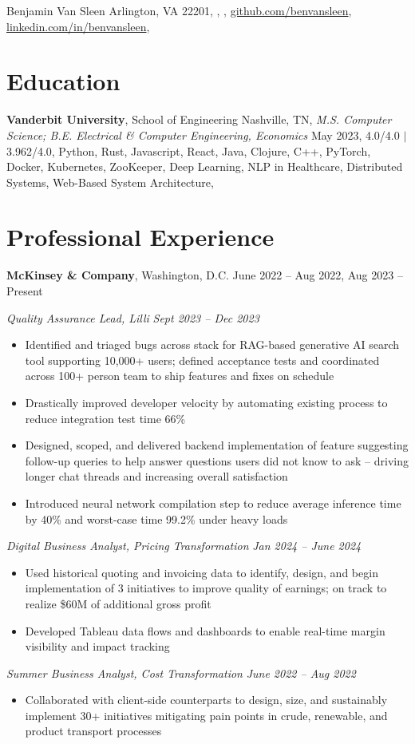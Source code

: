 \documentclass[10.5pt]{article}
\newcommand{\postlinebreakspacing} {
  \vspace{0.4ex}
}
\newcommand{\roleheader}[3]{
  \postlinebreakspacing
  \textbf{#1}, #2 \hfill #3
}
\newcommand{\role}[4]{
  \roleheader{#1}{#2}{#3}

  #4
}
\newcommand{\subrole}[5]{
  \vspace{0.1ex}
  \textit{#1, #2} \hfill \textit{#3 -- #4}

  \begin{itemize}
    #5
  \end{itemize}
}
\begin{document}

\resumeheader
{Benjamin Van Sleen}
{
	{Arlington, VA 22201},
	\PHONE,
	\href{mailto:\EMAIL}{\EMAIL},
	\href{https://github.com/benvansleen}{github.com/benvansleen},
	\href{https://linkedin.com/in/benvansleen}{linkedin.com/in/benvansleen},
}

\section*{Education}
\postlinebreakspacing
\lines
{
	{\textbf{Vanderbit University}, School of Engineering \hfill Nashville, TN},
	\hspace*{1em}\textit{M.S. Computer Science; B.E. Electrical \& Computer Engineering, Economics} \hfill May 2023,
	 {4.0/4.0} $\mid$  {3.962/4.0},
	 {Python, Rust, Javascript, React, Java, Clojure, C++, PyTorch, Docker, Kubernetes, ZooKeeper},
	 {Deep Learning, NLP in Healthcare, Distributed Systems, Web-Based System Architecture},
}


\section*{Professional Experience}
\role
{McKinsey \& Company}
{Washington, D.C.}
{June 2022 -- Aug 2022, Aug 2023 -- Present}
{
	\subrole
	{Quality Assurance Lead}
	{Lilli}
	{Sept 2023}
	{Dec 2023}
	{
		\item Identified and triaged bugs across stack for RAG-based generative AI search tool supporting 10,000+ users; defined acceptance tests and coordinated across 100+ person team to ship features and fixes on schedule
		\item Drastically improved developer velocity by automating existing process to reduce integration test time 66\%
		\item Designed, scoped, and delivered backend implementation of feature suggesting follow-up queries to help answer questions users did not know to ask – driving longer chat threads and increasing overall satisfaction
		\item Introduced neural network compilation step to reduce average inference time by 40\% and worst-case time 99.2\% under heavy loads
	}

	\subrole
	{Digital Business Analyst}
	{Pricing Transformation}
	{Jan 2024}
	{June 2024}
	{
		\item Used historical quoting and invoicing data to identify, design, and begin implementation of 3 initiatives to improve quality of earnings; on track to realize \$60M of additional gross profit
		\item Developed Tableau data flows and dashboards to enable real-time margin visibility and impact tracking
	}

	\subrole
	{Summer Business Analyst}
	{Cost Transformation}
	{June 2022}
	{Aug 2022}
	{
		\item Collaborated with client-side counterparts to design, size, and sustainably implement 30+ initiatives mitigating pain points in crude, renewable, and product transport processes

	}
}
\end{document}
